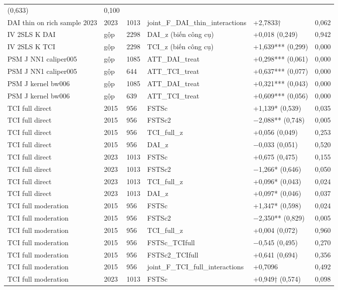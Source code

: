 \documentclass[12pt,a4paper]{article}
\begin{document}
\begin{longtable}[]{@{}llllll@{}}
(0,633) & 0,100 \\
DAI thin on rich sample 2023 & 2023 & 1013 &
joint\_F\_DAI\_thin\_interactions & +2,7833† & 0,062 \\
IV 2SLS K DAI & gộp & 2298 & DAI\_z (biến công cụ) & +0,018 (0,249) &
0,942 \\
IV 2SLS K TCI & gộp & 2298 & TCI\_z (biến công cụ) & +1,639*** (0,299) &
0,000 \\
PSM J NN1 caliper005 & gộp & 1085 & ATT\_DAI\_treat & +0,298*** (0,061)
& 0,000 \\
PSM J NN1 caliper005 & gộp & 644 & ATT\_TCI\_treat & +0,637*** (0,077) &
0,000 \\
PSM J kernel bw006 & gộp & 1085 & ATT\_DAI\_treat & +0,321*** (0,043) &
0,000 \\
PSM J kernel bw006 & gộp & 639 & ATT\_TCI\_treat & +0,609*** (0,056) &
0,000 \\
TCI full direct & 2015 & 956 & FSTSc & +1,139* (0,539) & 0,035 \\
TCI full direct & 2015 & 956 & FSTSc2 & −2,088** (0,748) & 0,005 \\
TCI full direct & 2015 & 956 & TCI\_full\_z & +0,056 (0,049) & 0,253 \\
TCI full direct & 2015 & 956 & DAI\_z & −0,033 (0,051) & 0,520 \\
TCI full direct & 2023 & 1013 & FSTSc & +0,675 (0,475) & 0,155 \\
TCI full direct & 2023 & 1013 & FSTSc2 & −1,266* (0,646) & 0,050 \\
TCI full direct & 2023 & 1013 & TCI\_full\_z & +0,096* (0,043) &
0,024 \\
TCI full direct & 2023 & 1013 & DAI\_z & +0,097* (0,046) & 0,037 \\
TCI full moderation & 2015 & 956 & FSTSc & +1,347* (0,598) & 0,024 \\
TCI full moderation & 2015 & 956 & FSTSc2 & −2,350** (0,829) & 0,005 \\
TCI full moderation & 2015 & 956 & TCI\_full\_z & +0,004 (0,072) &
0,960 \\
TCI full moderation & 2015 & 956 & FSTSc\_TCIfull & −0,545 (0,495) &
0,270 \\
TCI full moderation & 2015 & 956 & FSTSc2\_TCIfull & +0,641 (0,694) &
0,356 \\
TCI full moderation & 2015 & 956 & joint\_F\_TCI\_full\_interactions &
+0,7096 & 0,492 \\
TCI full moderation & 2023 & 1013 & FSTSc & +0,949† (0,574) & 0,098 \\

\end{longtable}
\end{document}

